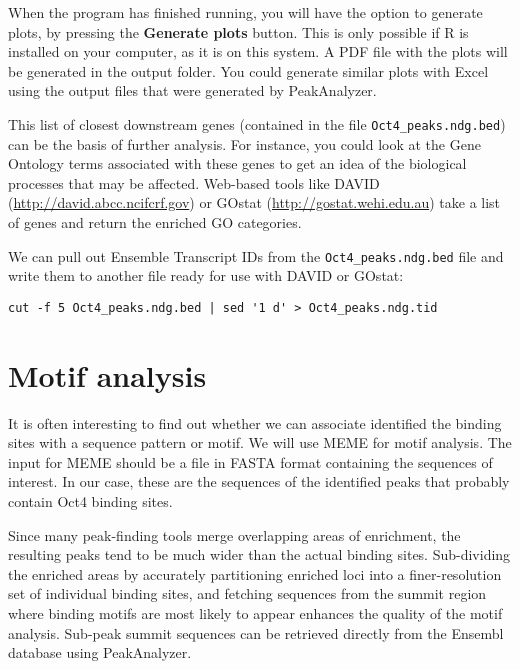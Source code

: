 \begin{information}
When the program has finished running, you will have the option to generate
plots, by pressing the \textbf{Generate plots} button. This is only possible if R is
installed on your computer, as it is on this system. A PDF file with the plots will be generated in
the output folder. You could generate similar plots with Excel using the output files that
were generated by PeakAnalyzer. 
\end{information}

\begin{note}
This list of closest downstream genes (contained in the file
\texttt{Oct4\_peaks.ndg.bed}) can be the basis of further analysis. For instance,
you could look at the Gene Ontology terms associated with these genes to get an
idea of the biological processes that may be affected. Web-based tools like
DAVID (\url{http://david.abcc.ncifcrf.gov}) or GOstat
(\url{http://gostat.wehi.edu.au}) take a list of genes and return the enriched
GO categories.
\end{note}

\begin{bonus}
We can pull out Ensemble Transcript IDs from the \texttt{Oct4\_peaks.ndg.bed}
file and write them to another file ready for use with DAVID or GOstat:
\begin{lstlisting}
cut -f 5 Oct4_peaks.ndg.bed | sed '1 d' > Oct4_peaks.ndg.tid
\end{lstlisting}
\end{bonus}

\section{Motif analysis}

\begin{information}
It is often interesting to find out whether we can associate identified the
binding sites with a sequence pattern or motif. We will use MEME for motif
analysis. The input for MEME should be a file in FASTA format containing the
sequences of interest. In our case, these are the sequences of the identified
peaks that probably contain Oct4 binding sites.

Since many peak-finding tools merge overlapping areas of enrichment, the
resulting peaks tend to be much wider than the actual binding sites.
Sub-dividing the enriched areas by accurately partitioning enriched loci into a
finer-resolution set of individual binding sites, and fetching sequences from
the summit region where binding motifs are most likely to appear enhances the
quality of the motif analysis. Sub-peak summit sequences can be retrieved
directly from the Ensembl database using PeakAnalyzer.
\end{information}

